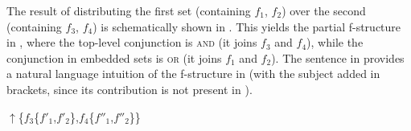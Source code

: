 \documentclass[output=paper]{../langscibook}
\begin{document}
The result of distributing the first set (containing $f_{1}$, $f_{2}$) over the second (containing $f_{3}$, $f_{4}$)
is schematically shown in . This yields the
partial f-structure in , where the top-level
conjunction is \textsc{and} (it joins $f_{3}$ and $f_{4}$), while the
conjunction in embedded sets is \textsc{or} (it joins $f_{1}$ and $f_{2}$). The
sentence in  provides a natural
language intuition of the f-structure in 
(with the subject added in brackets, since its contribution is not
present in ).

\largerpage
\ea\label{ex:max:man:96:S2} $\uparrow$\{$f_{3}$\{$f'_{1}$,$f'_{2}$\},$f_{4}$\{$f''_{1}$,$f''_{2}$\}\}\z
{}
\end{document}
